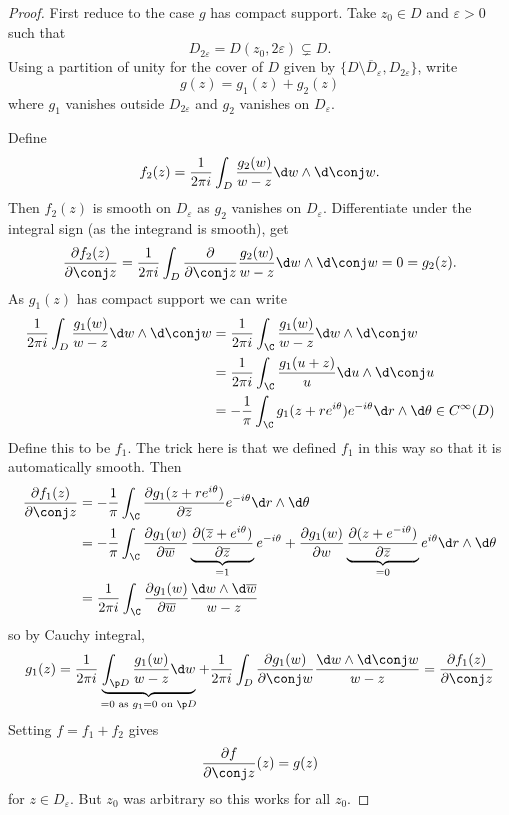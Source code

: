 \documentclass[a4paper]{article}
\newcommand{\w}{\wedge} %
\begin{document}
\begin{proof}
  First reduce to the case \(g\) has compact support. Take \(z_0 \in D\) and \(\varepsilon > 0\) such that
  \[
    D_{2\varepsilon} = D(z_0, 2\varepsilon) \subsetneq D.
  \]
  Using a partition of unity for the cover of \(D\) given by \(\{D \setminus \overline D_\varepsilon, D_{2\varepsilon}\}\), write
  \[
    g(z) = g_1(z) + g_2(z)
  \]
  where \(g_1\) vanishes outside \(D_{2\varepsilon}\) and \(g_2\) vanishes on \(D_\varepsilon\).

  Define
  \[
    f_2(z) = \frac{1}{2\pi i} \int_D \frac{g_2(w)}{w - z} \d w \w \d \conj w.
  \]
  Then \(f_2(z)\) is smooth on \(D_\varepsilon\) as \(g_2\) vanishes on \(D_\varepsilon\). Differentiate under the integral sign (as the integrand is smooth), get
  \[
    \frac{\partial f_2(z)}{\partial \conj z} = \frac{1}{2\pi i} \int_D \frac{\partial  }{\partial \conj z} \frac{g_2(w)}{w - z} \d w \w \d \conj w = 0 = g_2(z).
  \]
  As \(g_1(z)\) has compact support we can write
  \begin{align*}
    \frac{1}{2\pi i} \int_D \frac{g_1(w)}{w - z} \d w \w \d\conj w
    &= \frac{1}{2\pi i} \int_\C \frac{g_1(w)}{w - z} \d w \w \d \conj w \\
    &= \frac{1}{2\pi i} \int_\C \frac{g_1(u + z)}{u} \d u \w \d \conj u \\
    &= -\frac{1}{\pi} \int_\C g_1(z + re^{i\theta}) e^{-i\theta} \d r \w \d\theta \in C^\infty(D)
  \end{align*}
  Define this to be \(f_1\). The trick here is that we defined \(f_1\) in this way so that it is automatically smooth. Then
  \begin{align*}
    \frac{\partial f_1(z)}{\partial \conj z}
    &= - \frac{1}{\pi} \int_\C \frac{\partial g_1(z + r e^{i\theta})}{\partial \overline z} e^{-i\theta} \d r \w \d \theta \\
    &= - \frac{1}{\pi} \int_\C \frac{\partial g_1(w)}{\partial \overline w} \underbrace{\frac{\partial(\overline z + e^{i\theta})}{\partial \overline z}}_{= 1} e^{-i\theta} + \frac{\partial g_1(w)}{\partial w} \underbrace{\frac{\partial(z + e^{-i\theta})}{\partial \overline z}}_{= 0} e^{i\theta} \d r \w \d \theta \\
    &= \frac{1}{2\pi i} \int_\C \frac{\partial g_1(w)}{\partial \overline w} \frac{\d w \w \d \overline w}{w - z} \\ 
  \end{align*}
  so by Cauchy integral,
  \[
    g_1(z)
    = \frac{1}{2\pi i} \underbrace{\int_{\p D} \frac{g_1(w)}{w - z}\d w}_{= 0 \text{ as } g_1 = 0 \text{ on } \p D} + \frac{1}{2\pi i} \int_D \frac{\partial g_1(w)}{\partial \conj w} \frac{\d w \w \d\conj w}{w - z}
    = \frac{\partial f_1(z)}{\partial \conj z}
  \]
  Setting \(f = f_1 + f_2\) gives
  \[
    \frac{\partial f}{\partial \conj z}(z) = g(z)
  \]
  for \(z \in D_\varepsilon\). But \(z_0\) was arbitrary so this works for all \(z_0\).
\end{proof}
\end{document}
